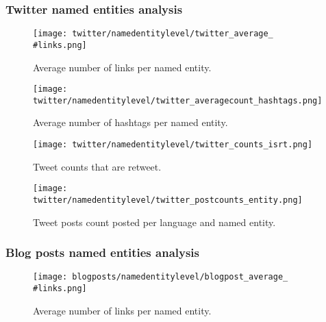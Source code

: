 \subsubsection{Twitter named entities analysis}

\begin{figure}[H]
	\begin{center}
		\texttt{[image: twitter/namedentitylevel/twitter\_average\_\\\#links.png]}
		\caption{Average number of links per named entity.}
		\label{fig:twitter_average_links}
	\end{center}
\end{figure}


\begin{figure}[H]
	\begin{center}
		\texttt{[image: twitter/namedentitylevel/twitter\_averagecount\_hashtags.png]}
		\caption{Average number of hashtags per named entity.}
		\label{fig:twitter_averagecount_hashtags}
	\end{center}
\end{figure}

\begin{figure}[H]
	\begin{center}
		\texttt{[image: twitter/namedentitylevel/twitter\_counts\_isrt.png]}
		\caption{Tweet counts that are retweet.}
		\label{fig:twitter_counts_isrt}
	\end{center}
\end{figure}

\begin{figure}[H]
	\begin{center}
		\texttt{[image: twitter/namedentitylevel/twitter\_postcounts\_entity.png]}
		\caption{Tweet posts count posted per language and named entity.}
		\label{fig:twitter_postcounts_entity}
	\end{center}
\end{figure}



\subsubsection{Blog posts named entities analysis}


\begin{figure}[H]
	\begin{center}
		\texttt{[image: blogposts/namedentitylevel/blogpost\_average\_\\\#links.png]}
		\caption{Average number of links per named entity.}
		\label{fig:blogpost_average_links}
	\end{center}
\end{figure}

